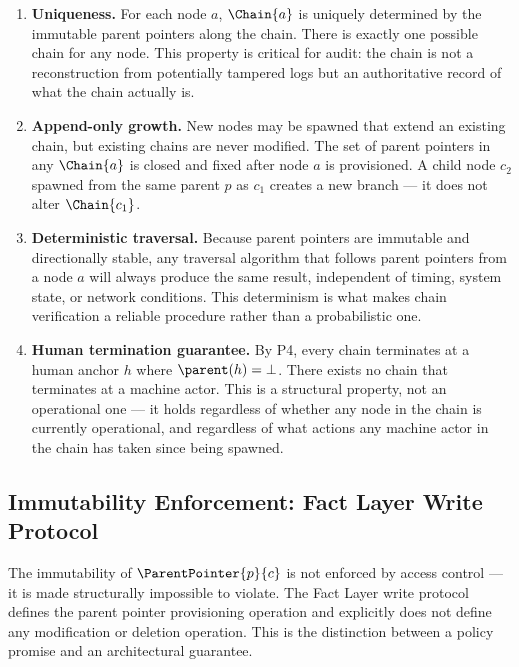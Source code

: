 \begin{enumerate}
    \item \textbf{Uniqueness.} For each node $a$, $\Chain{a}$ is uniquely determined by the immutable parent pointers along the chain. There is exactly one possible chain for any node. This property is critical for audit: the chain is not a reconstruction from potentially tampered logs but an authoritative record of what the chain actually is.

    \item \textbf{Append-only growth.} New nodes may be spawned that extend an existing chain, but existing chains are never modified. The set of parent pointers in any $\Chain{a}$ is closed and fixed after node $a$ is provisioned. A child node $c_2$ spawned from the same parent $p$ as $c_1$ creates a new branch — it does not alter $\Chain{c_1}$.

    \item \textbf{Deterministic traversal.} Because parent pointers are immutable and directionally stable, any traversal algorithm that follows parent pointers from a node $a$ will always produce the same result, independent of timing, system state, or network conditions. This determinism is what makes chain verification a reliable procedure rather than a probabilistic one.

    \item \textbf{Human termination guarantee.} By P4, every chain terminates at a human anchor $h$ where $\parent(h) = \bot$. There exists no chain that terminates at a machine actor. This is a structural property, not an operational one — it holds regardless of whether any node in the chain is currently operational, and regardless of what actions any machine actor in the chain has taken since being spawned.
\end{enumerate}

\subsection{Immutability Enforcement: Fact Layer Write Protocol}
\label{sec:fact-layer-immutability}

The immutability of $\ParentPointer{p}{c}$ is not enforced by access control — it is made structurally impossible to violate. The Fact Layer write protocol defines the parent pointer provisioning operation and explicitly does not define any modification or deletion operation. This is the distinction between a policy promise and an architectural guarantee.

